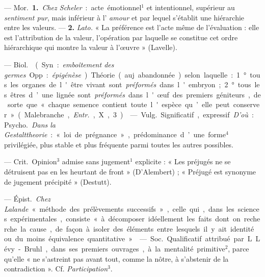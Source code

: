 \begin{itemize}[leftmargin=1cm, label=, itemsep=1pt]
 — \si{Mor.} {\bf 1.} {\it Chez Scheler} : acte émotionnel$^1$
et intentionnel, supérieur au {\it sentiment pur}, mais inférieur à l'{\it
amour} et par lequel s'établit une hiérarchie entre les valeurs. — {\bf 2.}
{\it Lato.} « La préférence est l'acte même de l'évaluation : elle est
l’attribution de la valeur, l’opération par laquelle se constitue cet ordre
hiérarchique qui montre la valeur à l’œuvre » (Lavelle).

 — \si{Biol.}  (Syn. : {\it emboîtement des
germes}. Opp. : {\it épigénèse}). Théorie (auj. abandonnée) selon laquelle :
1° tous les organes de l'être vivant sont {\it préformés} dans l'embryon; 2°
tous les êtres d’une lignée sont {\it préformés} dans l'œuf des premiers
géniteurs, de sorte que « chaque semence contient toute l'espèce qu’elle peut
conserver » (Malebranche, {\it Entr.}, X, 3).

 — \si{Vulg.} Significatif, expressif. {\it D'où} : \si{Psycho.}
{\it Dans la Gestalttheorie} :
« loi de prégnance », prédominance d’une forme$^4$ privilégiée, plus stable
et plus fréquente parmi toutes les autres possibles.

 — \si{Crit.} Opinion$^3$ admise sans jugement$^1$ explicite : «
Les préjugés ne se détruisent pas en les heurtant de front » (D’Alembert) ; «
Préjugé est synonyme de jugement précipité » (Destutt).

 — \si{Épist.} {\it Chez Lalande} « méthode des prélèvements
successifs », celle qui, dans les sciences expérimentales, consiste « à
décomposer idéellement les faits dont on recherche la cause, de façon à
isoler des éléments entre lesquels il y ait identité ou du moins équivalence
quantitative ».

 — \si{Soc.} Qualificatif attribué par L. Lévy-Bruhl,
dans ses premiers ouvrages, à la mentalité primitive$^2$, parce qu'elle « ne
s’astreint pas avant tout, comme la nôtre, à s'abstenir de la contradiction
». Cf. {\it Participation}$^3$.


\end{itemize}
